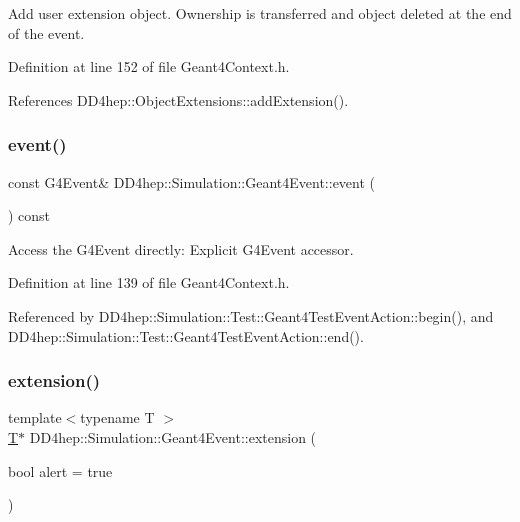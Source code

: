 Add user extension object. Ownership is transferred and object deleted at the end of the event. 



Definition at line 152 of file Geant4\+Context.\+h.



References D\+D4hep\+::\+Object\+Extensions\+::add\+Extension().

\hypertarget{class_d_d4hep_1_1_simulation_1_1_geant4_event_a0710c285cc5229795bf00c33ad7260fc}{}\label{class_d_d4hep_1_1_simulation_1_1_geant4_event_a0710c285cc5229795bf00c33ad7260fc} 
\subsubsection{\texorpdfstring{event()}{event()}}
{\footnotesize\ttfamily const G4\+Event\& D\+D4hep\+::\+Simulation\+::\+Geant4\+Event\+::event (\begin{DoxyParamCaption}{ }\end{DoxyParamCaption}) const\hspace{0.3cm}{\ttfamily [inline]}}



Access the G4\+Event directly\+: Explicit G4\+Event accessor. 



Definition at line 139 of file Geant4\+Context.\+h.



Referenced by D\+D4hep\+::\+Simulation\+::\+Test\+::\+Geant4\+Test\+Event\+Action\+::begin(), and D\+D4hep\+::\+Simulation\+::\+Test\+::\+Geant4\+Test\+Event\+Action\+::end().

\hypertarget{class_d_d4hep_1_1_simulation_1_1_geant4_event_a9484d88af250ffabccc8d717b6055ef7}{}\label{class_d_d4hep_1_1_simulation_1_1_geant4_event_a9484d88af250ffabccc8d717b6055ef7} 
\subsubsection{\texorpdfstring{extension()}{extension()}}
{\footnotesize\ttfamily template$<$typename T $>$ \\
\hyperlink{class_t}{T}$\ast$ D\+D4hep\+::\+Simulation\+::\+Geant4\+Event\+::extension (\begin{DoxyParamCaption}\item[{bool}]{alert = {\ttfamily true} }\end{DoxyParamCaption})\hspace{0.3cm}{\ttfamily [inline]}}



